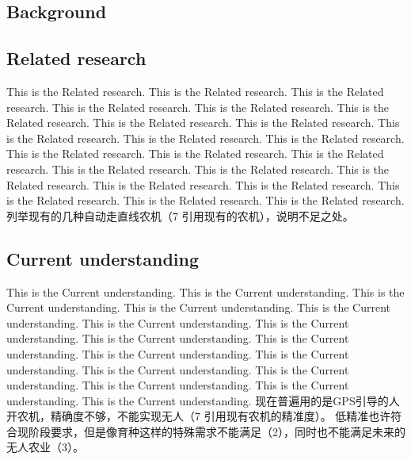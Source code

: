 \documentclass[12pt]{article}
\begin{document}
\begin{flushleft}
\section{Background}

\subsection{Related research}
This is the Related research. This is the Related research. This is the Related research. This is the Related research. This is the Related research. This is the Related research. This is the Related research. This is the Related research. This is the Related research. This is the Related research. This is the Related research. This is the Related research. This is the Related research. This is the Related research. This is the Related research. This is the Related research. This is the Related research. This is the Related research. This is the Related research. This is the Related research. This is the Related research. This is the Related research. \cite{lenain2006high}
列举现有的几种自动走直线农机（7 引用现有的农机），说明不足之处。

\subsection{Current understanding}
This is the Current understanding. This is the Current understanding. This is the Current understanding. \cite{lenain2006high}This is the Current understanding. This is the Current understanding. This is the Current understanding. This is the Current understanding. This is the Current understanding. This is the Current understanding. This is the Current understanding. This is the Current understanding. This is the Current understanding.\cite{douglas2000navigation} This is the Current understanding. This is the Current understanding. This is the Current understanding. This is the Current understanding. \cite{egbelu1984characterization}
现在普遍用的是GPS引导的人开农机，精确度不够，不能实现无人（7 引用现有农机的精准度）。
低精准也许符合现阶段要求，但是像育种这样的特殊需求不能满足（2），同时也不能满足未来的无人农业（3）。


\end{flushleft}
\end{document}
